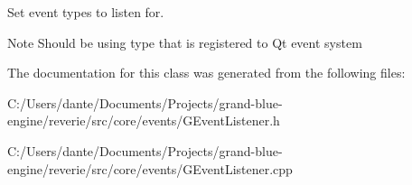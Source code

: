 Set event types to listen for. 

\begin{DoxyNote}{Note}
Should be using type that is registered to Qt event system 
\end{DoxyNote}


The documentation for this class was generated from the following files\+:\begin{DoxyCompactItemize}
\item 
C\+:/\+Users/dante/\+Documents/\+Projects/grand-\/blue-\/engine/reverie/src/core/events/G\+Event\+Listener.\+h\item 
C\+:/\+Users/dante/\+Documents/\+Projects/grand-\/blue-\/engine/reverie/src/core/events/G\+Event\+Listener.\+cpp\end{DoxyCompactItemize}

